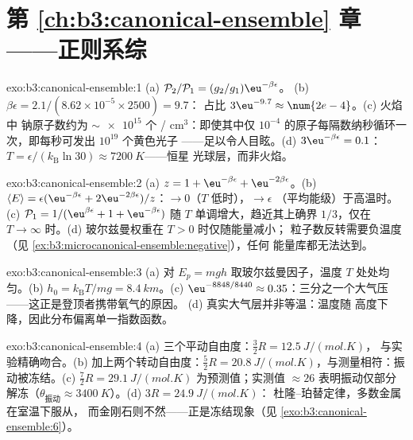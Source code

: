 \section*{第 \ref{ch:b3:canonical-ensemble} 章——正则系综}

\begin{solution}{exo:b3:canonical-ensemble:1}
(a) $\mathcal P_2/\mathcal P_1 = (g_2/g_1)\eu^{-\beta\epsilon}$。
(b) $\beta\epsilon = 2.1/(8.62\times10^{-5} \times 2500) = 9.7$：
占比 $3\eu^{-9.7} \approx \num{2e-4}$。(c) 火焰中
钠原子数约为 $\sim\num{e15}$ 个 / cm$^3$：即使其中仅 $10^{-4}$
的原子每隔数纳秒循环一次，即每秒可发出 $10^{19}$ 个黄色光子
——足以令人目眩。(d) $3\eu^{-\beta\epsilon} = 0.1$：
$T = \epsilon/(k_{\text{B}}\ln30) \approx \qty{7200}{K}$——恒星
光球层，而非火焰。
\end{solution}

\begin{solution}{exo:b3:canonical-ensemble:2}
(a) $z = 1 + \eu^{-\beta\epsilon} + \eu^{-2\beta\epsilon}$。(b)
$\langle E\rangle = \epsilon(\eu^{-\beta\epsilon} +
2\eu^{-2\beta\epsilon})/z$：$\to 0$（$T$ 低时），$\to \epsilon$
（平均能级）于高温时。(c) $\mathcal P_1 = 1/(\eu^{\beta
\epsilon} + 1 + \eu^{-\beta\epsilon})$ 随
$T$ 单调增大，趋近其上确界 $1/3$，仅在 $T \to \infty$ 时。(d)
玻尔兹曼权重在 $T > 0$ 时仅随能量减小；
粒子数反转需要负温度（见
\cref{ex:b3:microcanonical-ensemble:negative}），任何
能量库都无法达到。
\end{solution}

\begin{solution}{exo:b3:canonical-ensemble:3}
(a) 对 $E_p = mgh$ 取玻尔兹曼因子，温度 $T$ 处处均匀。(b) $h_0 =
k_{\text{B}}T/mg = \qty{8.4}{km}$。(c) $\eu^{-8848/8440} \approx
0.35$：三分之一个大气压——这正是登顶者携带氧气的原因。
(d) 真实大气层并非等温：温度随
高度下降，因此分布偏离单一指数函数。
\end{solution}

\begin{solution}{exo:b3:canonical-ensemble:4}
(a) 三个平动自由度：$\tfrac32 R = \qty{12.5}{J/(mol.K)}$，
与实验精确吻合。(b) 加上两个转动自由度：$\tfrac52 R =
\qty{20.8}{J/(mol.K)}$，与测量相符：振动被冻结。(c)
$\tfrac72 R = \qty{29.1}{J/(mol.K)}$ 为预测值；实测值
$\approx26$ 表明振动仅部分解冻（$\theta_{\text{振动}}
\approx \qty{3400}{K}$）。(d) $3R = \qty{24.9}{J/(mol.K)}$：
杜隆–珀替定律，多数金属在室温下服从，
而金刚石则不然——正是冻结现象（见
\cref{exo:b3:canonical-ensemble:6}）。
\end{solution}

